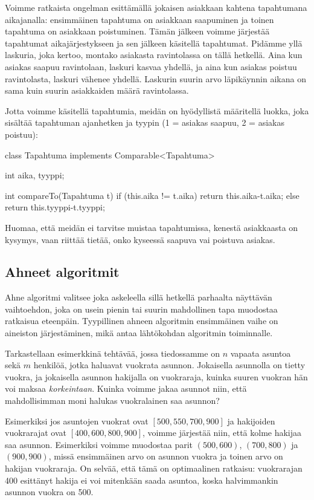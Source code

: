 Voimme ratkaista ongelman esittämällä jokaisen asiakkaan kahtena
tapahtumana aikajanalla: ensimmäinen tapahtuma on asiakkaan
saapuminen ja toinen tapahtuma on asiakkaan poistuminen.
Tämän jälkeen voimme järjestää tapahtumat aikajärjestykseen
ja sen jälkeen käsitellä tapahtumat.
Pidämme yllä laskuria, joka kertoo, montako asiakasta ravintolassa
on tällä hetkellä.
Aina kun asiakas saapuu ravintolaan, laskuri kasvaa yhdellä,
ja aina kun asiakas poistuu ravintolasta,
laskuri vähenee yhdellä.
Laskurin suurin arvo läpikäynnin aikana on sama kuin
suurin asiakkaiden määrä ravintolassa.

Jotta voimme käsitellä tapahtumia, meidän on hyödyllistä määritellä
luokka, joka sisältää tapahtuman ajanhetken ja tyypin
(1 = asiakas saapuu, 2 = asiakas poistuu):

\begin{code}
class Tapahtuma implements Comparable<Tapahtuma> {
    int aika, tyyppi;

    int compareTo(Tapahtuma t) {
        if (this.aika != t.aika) return this.aika-t.aika;
        else return this.tyyppi-t.tyyppi;
    }
}
\end{code}

Huomaa, että meidän ei tarvitse muistaa tapahtumissa,
kenestä asiakkaasta on kysymys, vaan riittää tietää,
onko kyseessä saapuva vai poistuva asiakas.

\subsection{Ahneet algoritmit}

Ahne algoritmi valitsee joka askeleella sillä hetkellä parhaalta
näyttävän vaihtoehdon, joka on usein pienin tai suurin mahdollinen
tapa muodostaa ratkaisua eteenpäin.
Tyypillinen ahneen algoritmin ensimmäinen vaihe on aineiston
järjestäminen, mikä antaa lähtökohdan algoritmin toiminnalle.

Tarkastellaan esimerkkinä tehtävää, jossa tiedossamme on
$n$ vapaata asuntoa sekä $m$ henkilöä, jotka haluavat vuokrata asunnon.
Jokaisella asunnolla on tietty vuokra,
ja jokaisella asunnon hakijalla on vuokraraja,
kuinka suuren vuokran hän voi maksaa \emph{korkeintaan}.
Kuinka voimme jakaa asunnot niin, että mahdollisimman moni
halukas vuokralainen saa asunnon?

Esimerkiksi jos asuntojen vuokrat ovat $[500,550,700,900]$
ja hakijoiden vuokrarajat ovat $[400,600,800,900]$,
voimme järjestää niin, että kolme hakijaa saa asunnon.
Esimerkiksi voimme muodostaa parit $(500,600)$, $(700,800)$
ja $(900,900)$, missä ensimmäinen arvo on asunnon vuokra
ja toinen arvo on hakijan vuokraraja.
On selvää, että tämä on optimaalinen ratkaisu:
vuokrarajan 400 esittänyt hakija ei voi mitenkään saada asuntoa,
koska halvimmankin asunnon vuokra on 500.

